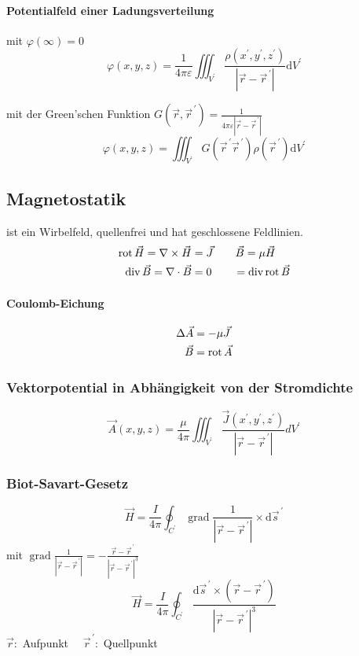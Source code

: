 \paragraph*{Potentialfeld einer Ladungsverteilung}
mit $\varphi(\infty)=0$
\[\varphi(x, y, z)=\frac{1}{4 \pi \varepsilon} \iiint_{V^{\prime}} \frac{\rho\left(x^{\prime}, y^{\prime}, z^{\prime}\right)}{\left|\vec{r}-\vec{r}^{\,\prime}\right|} \mathrm{d} V^{\prime}\]

mit der Green'schen Funktion $G\left(\vec{r}, \vec{r}^{\,\prime}\right)=\frac{1}{4 \pi \varepsilon\left|\vec{r}-\vec{r}^{\,\prime}\right|}$
\[\varphi(x, y, z)=\iiint_{V^{\prime}} G\left(\vec{r}^{\,\prime} \vec{r}^{\,\prime}\right) \rho\left(\vec{r}^{\,\prime}\right) \mathrm{d} V^{\prime}\]


\subsection{Magnetostatik}
ist ein Wirbelfeld, quellenfrei und hat geschlossene Feldlinien.
\begin{align*}
    \operatorname{rot} \vec{H} = \nabla \times \vec{H} & = \vec{J}  \qquad \vec{B} = \mu \vec{H}   \\
    \operatorname{div} \vec{B} = \nabla \cdot \vec{B}  & = 0        \qquad = \operatorname{div} \operatorname{rot} \vec{B}
\end{align*}

\paragraph*{Coulomb-Eichung}
\begin{align*}
    \Delta \vec{A} & = - \mu \vec{J}  \\
    \vec{B}        & = \operatorname{rot} \vec{A}
\end{align*}

\subsubsection{Vektorpotential in Abhängigkeit von der Stromdichte}
\[ \vec{A}(x, y, z)=\frac{\mu}{4 \pi} \iiint_{V^{\prime}} \frac{\vec{J}\left(x^{\prime}, y^{\prime}, z^{\prime}\right)}{\left|\vec{r}-\vec{r}^{\,\prime}\right|} d V^{\prime} \]

\subsubsection{Biot-Savart-Gesetz}
\[ \vec{H}=\frac{I}{4 \pi} \oint_{C^{\prime}} \operatorname{grad} \frac{1}{\left|\vec{r}-\vec{r}^{\,\prime}\right|} \times \mathrm{d} \vec{s}^{\,\prime}\]
mit $\operatorname{grad} \frac{1}{\left|\vec{r}-\vec{r}^{\,\prime}\right|}=-\frac{\vec{r}-\vec{r}^{\,\prime}}{\left|\vec{r}-\vec{r}^{\,\prime}\right|^{3}}$
\[\vec{H}=\frac{I}{4 \pi} \oint_{C^{\prime}} \frac{\mathrm{d} \vec{s}^{\,\prime} \times\left(\vec{r}-\vec{r}^{\,\prime}\right)}{\left|\vec{r}-\vec{r}^{\,\prime}\right|^{3}}\]
$\vec{r}:$ Aufpunkt $\quad \vec{r}^{\,\prime}:$ Quellpunkt


